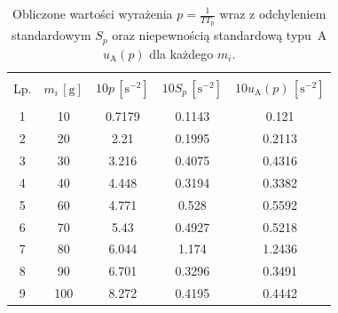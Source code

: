 \begin{table}[h]
\begin{center}
\renewcommand*{\tablename}{Tabela}
\caption{\small Obliczone wartości wyrażenia $p = \frac{1}{T T_{\mathrm{p}}}$ wraz z odchyleniem standardowym $S_p$ oraz niepewnością standardową typu~A $u_{\mathrm{A}}(p)$ dla każdego $m_i$.\vspace{0.15cm}
    \label{tab:regresja_dane}}
    {\small
    \begin{tabular}{c c c c c}
    \hline \vspace{-0.35cm} \\
      Lp. & $m_i \, [\mathrm{g}]$ & $10p \, [\mathrm{s}^{-2}]$ & $10 S_p \, [\mathrm{s}^{-2}]$ & $10 u_{\mathrm{A}}(p) \, [\mathrm{s}^{-2}]$ \\ 
      \hline \vspace{-0.2cm} \\
     1 & 10 & 0.7179 & 0.1143 & 0.121 \\
     2 & 20 & 2.21 & 0.1995 & 0.2113 \\
     3 & 30 & 3.216 & 0.4075 & 0.4316 \\
     4 & 40 & 4.448 & 0.3194 & 0.3382 \\
     5 & 60 & 4.771 & 0.528 & 0.5592 \\
     6 & 70 & 5.43 & 0.4927 & 0.5218 \\
     7 & 80 & 6.044 & 1.174 & 1.2436 \\
     8 & 90 & 6.701 & 0.3296 & 0.3491 \\
     9 & 100 & 8.272 & 0.4195 & 0.4442 \\
    \hline
    \end{tabular}}
    \end{center}
\end{table}
